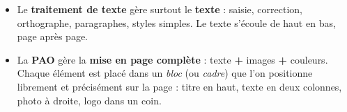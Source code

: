 \documentclass[11pt]{article}
\begin{document}
\begin{propriete}
\begin{itemize}
\item Le \textbf{traitement de texte} gère surtout le \textbf{texte} : saisie, correction, orthographe, paragraphes, styles simples. Le texte s'écoule de haut en bas, page après page.
\item La \textbf{PAO} gère la \textbf{mise en page complète} : texte \textbf{+} images \textbf{+} couleurs. Chaque élément est placé dans un \emph{bloc} (ou \emph{cadre}) que l'on positionne librement et précisément sur la page : titre en haut, texte en deux colonnes, photo à droite, logo dans un coin.
\end{itemize}
\end{propriete}
\end{document}
